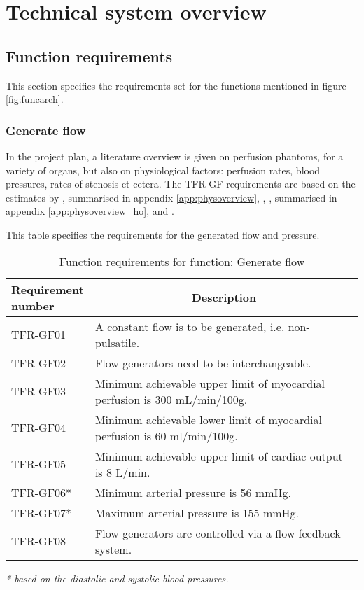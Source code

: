 \chapter{Technical system overview}

\section{Function requirements}
This section specifies the requirements set for the functions mentioned in figure \ref{fig:funcarch}.
\subsection{Generate flow}
In the project plan, a literature overview is given on perfusion phantoms, for a variety of organs, but also on physiological factors: perfusion rates, blood pressures, rates of stenosis et cetera. The TFR-GF requirements are based on the estimates by \cite{uren1994relation}, summarised in appendix \ref{app:physoverview}, \cite{chiribiri2013normal}, \cite{ho2014dynamic}, summarised in appendix \ref{app:physoverview_ho}, and \cite{slart2015pres}.

\begin{table} [H]
\caption{Function requirements for function: Generate flow}
\label{tab:funcreq_tec}
This table specifies the requirements for the generated flow and pressure.
\begin{tabular}{l|p{120mm}|}
	\makecell[l]{\textbf{Requirement} \\  \textbf{number}} & \multicolumn{1}{c}{\textbf{Description}}\\
	\hline
	TFR-GF01 & A constant flow is to be generated, i.e. non-pulsatile. \\
	TFR-GF02 & Flow generators need to be interchangeable. \\
	TFR-GF03 & Minimum achievable upper limit of myocardial perfusion is 300 mL/min/100g. \\
	TFR-GF04 & Minimum achievable lower limit of myocardial perfusion is 60 ml/min/100g. \\
	TFR-GF05 & Minimum achievable upper limit of cardiac output is 8 L/min.\\
	TFR-GF06* & Minimum arterial pressure is 56 mmHg. \\
	TFR-GF07* & Maximum arterial pressure is  155 mmHg. \\
	TFR-GF08 & Flow generators are controlled via a flow feedback system. \\
	\cline{2-2}
\end{tabular}
\raggedright
\textit{* based on the diastolic and systolic blood pressures.}
\end{table}

